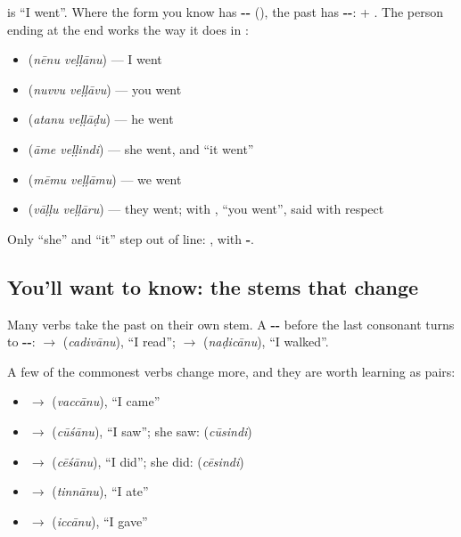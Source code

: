 \textbf{} is \textquotedblleft{}I went\textquotedblright{}. Where the form you know has \textbf{--} (\textbf{}), the past has \textbf{--}: \textbf{} + \textbf{}. The person ending at the end works the way it does in \textbf{}:

\begin{itemize}
\raggedright
  \item \textbf{ } (\emph{nēnu veḷḷānu}) — I went
  \item \textbf{ } (\emph{nuvvu veḷḷāvu}) — you went
  \item \textbf{ } (\emph{atanu veḷḷāḍu}) — he went
  \item \textbf{ } (\emph{āme veḷḷindi}) — she went, and \textquotedblleft{}it went\textquotedblright{}
  \item \textbf{ } (\emph{mēmu veḷḷāmu}) — we went
  \item \textbf{ } (\emph{vāḷḷu veḷḷāru}) — they went; with \textbf{}, \textquotedblleft{}you went\textquotedblright{}, said with respect
\end{itemize}

Only \textquotedblleft{}she\textquotedblright{} and \textquotedblleft{}it\textquotedblright{} step out of line: \textbf{}, with \textbf{-}.

\subsection*{You'll want to know: the stems that change}
Many verbs take the past on their own stem. A \textbf{--} before the last consonant turns to \textbf{--}: \textbf{} $\to$ \textbf{} (\emph{cadivānu}), \textquotedblleft{}I read\textquotedblright{}; \textbf{} $\to$ \textbf{} (\emph{naḍicānu}), \textquotedblleft{}I walked\textquotedblright{}.

A few of the commonest verbs change more, and they are worth learning as pairs:

\begin{itemize}
\raggedright
  \item \textbf{} $\to$ \textbf{} (\emph{vaccānu}), \textquotedblleft{}I came\textquotedblright{}
  \item \textbf{} $\to$ \textbf{} (\emph{cūśānu}), \textquotedblleft{}I saw\textquotedblright{}; she saw: \textbf{} (\emph{cūsindi})
  \item \textbf{} $\to$ \textbf{} (\emph{cēśānu}), \textquotedblleft{}I did\textquotedblright{}; she did: \textbf{} (\emph{cēsindi})
  \item \textbf{} $\to$ \textbf{} (\emph{tinnānu}), \textquotedblleft{}I ate\textquotedblright{}
  \item \textbf{} $\to$ \textbf{} (\emph{iccānu}), \textquotedblleft{}I gave\textquotedblright{}
\end{itemize}

